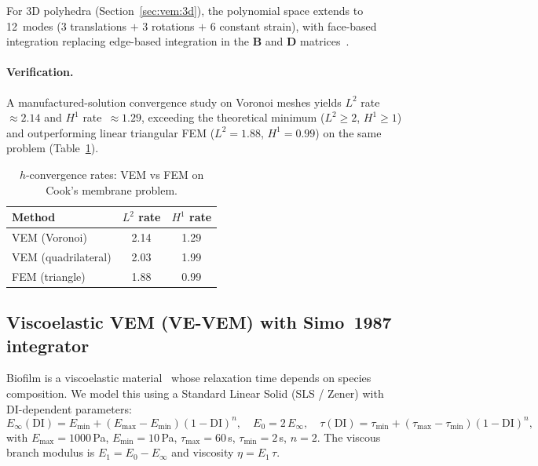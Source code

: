 For 3D polyhedra (Section~\ref{sec:vem:3d}), the polynomial space extends
to 12~modes (3 translations $+$ 3 rotations $+$ 6 constant strain),
with face-based integration replacing edge-based integration in the
$\mathbf{B}$ and $\mathbf{D}$ matrices~\cite{Wriggers2024}.

\paragraph{Verification.}
A manufactured-solution convergence study on Voronoi meshes yields
$L^2$ rate~$\approx 2.14$ and $H^1$ rate~$\approx 1.29$, exceeding the
theoretical minimum ($L^2 \geq 2$, $H^1 \geq 1$) and outperforming
linear triangular FEM ($L^2 = 1.88$, $H^1 = 0.99$) on the same problem
(Table~\ref{tab:vem_convergence}).

\begin{table}[h]
\centering
\caption{$h$-convergence rates: VEM vs FEM on Cook's membrane problem.}
\label{tab:vem_convergence}
\begin{tabular}{lcc}
\toprule
Method & $L^2$ rate & $H^1$ rate \\
\midrule
VEM (Voronoi) & 2.14 & 1.29 \\
VEM (quadrilateral) & 2.03 & 1.99 \\
FEM (triangle) & 1.88 & 0.99 \\
\bottomrule
\end{tabular}
\end{table}

\subsection{Viscoelastic VEM (VE-VEM) with Simo~1987 integrator}
\label{sec:vem:viscoelastic}

Biofilm is a viscoelastic material~\cite{Peterson2015,Flemming2010} whose
relaxation time depends on species composition.  We model this using a
Standard Linear Solid (SLS / Zener) with DI-dependent parameters:
\begin{equation}
  E_\infty(\mathrm{DI}) = E_{\min} + (E_{\max}-E_{\min})(1-\mathrm{DI})^n,
  \quad
  E_0 = 2\,E_\infty,
  \quad
  \tau(\mathrm{DI}) = \tau_{\min} + (\tau_{\max}-\tau_{\min})(1-\mathrm{DI})^n,
  \label{eq:sls_params}
\end{equation}
with $E_{\max}=1000$\,Pa, $E_{\min}=10$\,Pa, $\tau_{\max}=60$\,s,
$\tau_{\min}=2$\,s, $n=2$.  The viscous branch modulus is
$E_1 = E_0 - E_\infty$ and viscosity $\eta = E_1\,\tau$.

